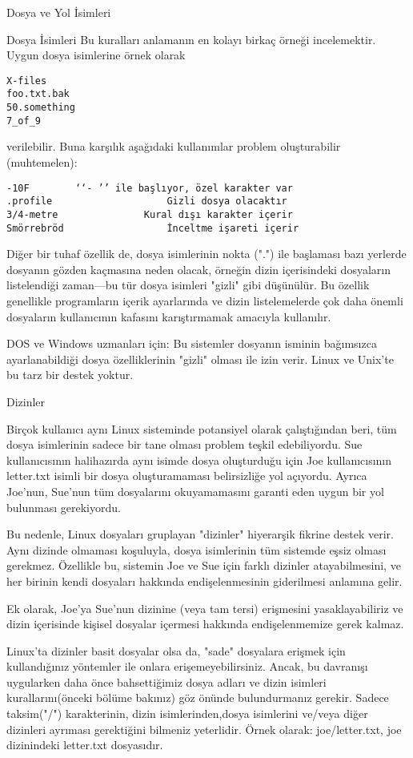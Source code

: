 \begin{section}{Dosya ve Yol İsimleri}
\begin{subsection}{Dosya İsimleri}
Bu kuralları anlamanın en kolayı birkaç örneği incelemektir. Uygun dosya isimlerine örnek olarak
\begin{verbatim}
X-files
foo.txt.bak
50.something
7_of_9
\end{verbatim}
verilebilir. Buna karşılık aşağıdaki kullanımlar problem oluşturabilir (muhtemelen):
\begin{verbatim}
-10F 		‘‘- ’’ ile başlıyor, özel karakter var
.profile 					Gizli dosya olacaktır
3/4-metre 				Kural dışı karakter içerir
Smörrebröd 					İnceltme işareti içerir
\end{verbatim}

Diğer bir tuhaf özellik de, dosya isimlerinin nokta (".") ile başlaması bazı yerlerde dosyanın gözden kaçmasına neden olacak, örneğin dizin içerisindeki dosyaların listelendiği zaman—bu tür dosya isimleri "gizli" gibi düşünülür. Bu özellik genellikle programların içerik ayarlarında ve dizin listelemelerde çok daha önemli dosyaların kullanıcının kafasını karıştırmamak amacıyla kullanılır.

DOS ve Windows uzmanları için: Bu sistemler dosyanın isminin bağımsızca ayarlanabildiği dosya özelliklerinin "gizli" olması ile izin verir. Linux ve Unix'te bu tarz bir destek yoktur.
\end{subsection}
\begin{subsection}{Dizinler}

Birçok kullanıcı aynı Linux sisteminde potansiyel olarak çalıştığından beri, tüm dosya isimlerinin sadece bir tane olması problem teşkil edebiliyordu. Sue kullanıcısının halihazırda aynı isimde dosya oluşturduğu için Joe kullanıcısının letter.txt isimli bir dosya oluşturamaması belirsizliğe yol açıyordu. Ayrıca Joe'nun, Sue'nun tüm dosyalarını okuyamamasını garanti eden uygun bir yol bulunması gerekiyordu.

Bu nedenle, Linux dosyaları gruplayan "dizinler" hiyerarşik fikrine destek verir. Aynı dizinde olmaması koşuluyla, dosya isimlerinin  tüm sistemde eşsiz olması gerekmez. Özellikle bu, sistemin Joe ve Sue için farklı dizinler atayabilmesini, ve her birinin kendi dosyaları hakkında endişelenmesinin giderilmesi anlamına gelir.
	
Ek olarak, Joe'ya Sue'nun dizinine (veya tam tersi) erişmesini yasaklayabiliriz ve dizin içerisinde kişisel dosyalar içermesi hakkında endişelenmemize gerek kalmaz.
	
Linux'ta dizinler basit dosyalar olsa da, "sade" dosyalara erişmek için kullandığınız yöntemler ile onlara erişemeyebilirsiniz. Ancak, bu davranışı uygularken daha önce bahsettiğimiz dosya adları ve dizin isimleri kurallarını(önceki bölüme bakınız) göz önünde bulundurmanız gerekir. Sadece taksim("/") karakterinin, dizin isimlerinden,dosya isimlerini ve/veya diğer dizinleri ayrıması gerektiğini bilmeniz yeterlidir. Örnek olarak: joe/letter.txt, joe dizinindeki letter.txt dosyasıdır.
	

\end{subsection}
\end{section}
